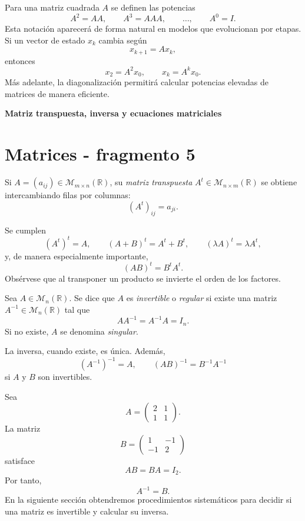 Para una matriz cuadrada $A$ se definen las potencias
\[
A^2=AA,
\qquad
A^3=AAA,
\qquad\ldots,
\qquad
A^0=I.
\]
Esta notación aparecerá de forma natural en modelos que evolucionan por etapas. Si un vector de estado $x_k$ cambia según
\[
x_{k+1}=Ax_k,
\]
entonces
\[
x_2=A^2x_0,
\qquad
x_k=A^kx_0.
\]
Más adelante, la diagonalización permitirá calcular potencias elevadas de matrices de manera eficiente.

\textbf{Matriz transpuesta, inversa y ecuaciones matriciales}


\section{Matrices - fragmento 5}
\begin{definition}
Si $A=(a_{ij})\in\mathcal M_{m\times n}(\mathbb{R})$, su \emph{matriz transpuesta} $A^t\in\mathcal M_{n\times m}(\mathbb{R})$ se obtiene intercambiando filas por columnas:
\[
(A^t)_{ij}=a_{ji}.
\]
\end{definition}

Se cumplen
\[
(A^t)^t=A,
\qquad
(A+B)^t=A^t+B^t,
\qquad
(\lambda A)^t=\lambda A^t,
\]
y, de manera especialmente importante,
\[
(AB)^t=B^tA^t.
\]
Obsérvese que al transponer un producto se invierte el orden de los factores.

\begin{definition}
Sea $A\in\mathcal M_n(\mathbb{R})$. Se dice que $A$ es \emph{invertible} o \emph{regular} si existe una matriz $A^{-1}\in\mathcal M_n(\mathbb{R})$ tal que
\[
AA^{-1}=A^{-1}A=I_n.
\]
Si no existe, $A$ se denomina \emph{singular}.
\end{definition}

La inversa, cuando existe, es única. Además,
\[
(A^{-1})^{-1}=A,
\qquad
(AB)^{-1}=B^{-1}A^{-1}
\]
si $A$ y $B$ son invertibles.

\begin{example}
Sea
\[
A=\begin{pmatrix}2&1\\1&1\end{pmatrix}.
\]
La matriz
\[
B=\begin{pmatrix}1&-1\\-1&2\end{pmatrix}
\]
satisface
\[
AB=BA=I_2.
\]
Por tanto,
\[
A^{-1}=B.
\]
En la siguiente sección obtendremos procedimientos sistemáticos para decidir si una matriz es invertible y calcular su inversa.
\end{example}

